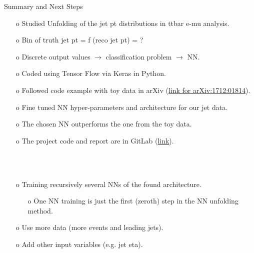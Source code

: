 \begin{frame}{Summary and Next Steps}
\begin{enumerate}
\item[o] Studied Unfolding of the jet pt distributions in ttbar e-mu analysis.
\item[o] Bin of truth jet pt = f (reco jet pt) = ?
\item[o] Discrete output values  $\rightarrow$ classification problem $\rightarrow$ NN.
\item[o] Coded using Tensor Flow via Keras in Python.
\item[o] Followed code example with toy data in arXiv (\href{https://arxiv.org/pdf/1712.01814.pdf}{link for arXiv:1712:01814}).
\item[o] Fine tuned NN hyper-parameters and architecture for our jet data.
\item[o] The chosen NN outperforms the one from the toy data.
\item[o] The project code and report are in GitLab (\href{https://gitlab.cern.ch/lciucu/MLUnfolding/}{link}).
\end{enumerate}
\ \\
\ \\
\begin{enumerate}
\item[o] Training recursively several NNs of the found architecture.
\begin{enumerate}
\item[o] One NN training is just the first (zeroth) step in the NN unfolding method.
\end{enumerate}
\item[o] Use more data (more events and leading jets).
\item[o] Add other input variables (e.g. jet eta).
\end{enumerate}
\end{frame}
\clearpage
